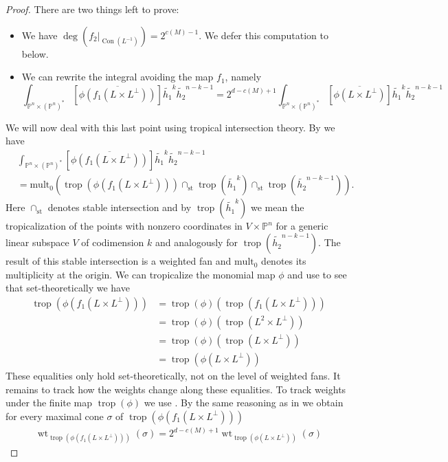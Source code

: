 \documentclass[12pt,a4paper,english]{scrartcl}
\newcommand{\PP}{\mathbb{P}}
\DeclareMathOperator{\weight}{wt}
\DeclareMathOperator{\trop}{trop}
\DeclareMathOperator{\Con}{Con}
\begin{document}
\begin{proof}
  There are two things left to prove: \begin{itemize}
      \item We have $\deg(f_2|_{\Con(L^{-1})})=2^{c(M)-1}$. We defer this computation to  below.
      \item We can rewrite the integral avoiding the map $f_1$, namely \[\int_{\PP^n\times (\PP^n)^*}[\overline{\phi(f_1(L\times L^\perp))}]\widetilde{h_1}^k\widetilde{h_2}^{n-k-1}=2^{d-c(M)+1}\int_{\PP^n\times (\PP^n)^*}[\overline{\phi(L\times L^\perp)}]\widetilde{h_1}^k\widetilde{h_2}^{n-k-1}
      \]
  \end{itemize} 
  We will now deal with this last point using tropical intersection theory. By \cite[Theorem 6.7.9]{Maclagan2015} we have \begin{align*}
      &\int_{\PP^n\times (\PP^n)^*}[\overline{\phi(f_1(L\times L^\perp))}]\widetilde{h_1}^k\widetilde{h_2}^{n-k-1}\\ &=\text{mult}_0(\trop(\phi(f_1(L\times L^\perp)))\cap_{\text{st}}\trop(\widetilde{h_1}^k)\cap_{\text{st}}\trop(\widetilde{h_2}^{n-k-1})).
  \end{align*}
  Here $\cap_{\text{st}}$ denotes stable intersection and by $\trop(\widetilde{h_1}^k)$ we mean the tropicalization of the points with nonzero coordinates in $V\times \PP^n$ for a generic linear subspace $V$ of codimension $k$ and analogously for $\trop(\widetilde{h_2}^{n-k-1})$. The result of this stable intersection is a weighted fan and $\text{mult}_0$ denotes its multiplicity at the origin. 
  We can tropicalize the monomial map $\phi$ and use  to see that set-theoretically we have \begin{align*}
      \trop(\phi(f_1(L\times L^\perp)))&=\trop(\phi)(\trop(f_1(L\times L^\perp)))\\&=\trop(\phi)(\trop(L^2\times L^\perp))\\&=\trop(\phi)(\trop(L\times L^\perp))\\ &=\trop(\phi(L\times L^\perp)) 
  \end{align*}
  These equalities only hold set-theoretically, not on the level of weighted fans. It remains to track how the weights change along these equalities. To track weights under the finite map $\trop(\phi)$ we use \cite[Theorem 3.12]{sturmfels2007tropical}. By the same reasoning as in  we obtain for every maximal cone $\sigma$ of $\trop(\phi(f_1(L\times L^\perp)))$
  \begin{align*}
      \weight_{\trop(\phi(f_1(L\times L^\perp)))}(\sigma)=2^{d-c(M)+1}\weight_{\trop(\phi(L\times L^\perp))}(\sigma)
  \end{align*}


\end{proof}
\end{document}
